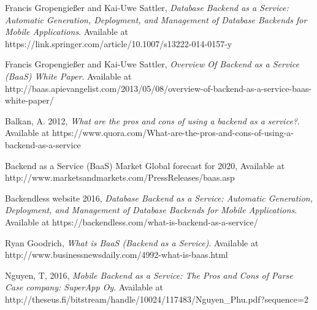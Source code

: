 \documentclass[a4paper]{report}
\begin{document}
    \begin{thebibliography}{9}
    	Francis Gropengießer and Kai-Uwe Sattler,
      \emph{Database Backend as a Service: Automatic Generation, Deployment, and Management of Database Backends for Mobile Applications}.
			Available at https://link.springer.com/article/10.1007/s13222-014-0157-y
			
    	Francis Gropengießer and Kai-Uwe Sattler,
      \emph{Overview Of Backend as a Service (BaaS) White Paper}.
			Available at http://baas.apievangelist.com/2013/05/08/overview-of-backend-as-a-service-baas-white-paper/
			
								
			Balkan, A. 2012,
      \emph{What are the pros and cons of using a backend as a service?}.
			Available at https://www.quora.com/What-are-the-pros-and-cons-of-using-a-backend-as-a-service
		
			Backend as a Service (BaaS) Market Global forecast for 2020,
			Available at http://www.marketsandmarkets.com/PressReleases/baas.asp		
		
			Backendless website 2016,
      \emph{Database Backend as a Service: Automatic Generation, Deployment, and Management of Database Backends for Mobile Applications}.
			Available at https://backendless.com/what-is-backend-as-a-service/
	

			Ryan Goodrich,
      \emph{What is BaaS (Backend as a Service)}.
			Available at http://www.businessnewsdaily.com/4992-what-is-baas.html	
			
			Nguyen, T, 2016,
      \emph{Mobile Backend as a Service: The Pros and Cons of Parse
			Case company: SuperApp Oy}.
			Available at http://theseus.fi/bitstream/handle/10024/117483/Nguyen{\_}Phu.pdf?sequence=2
		
		\end{thebibliography}	
    
\end{document}
